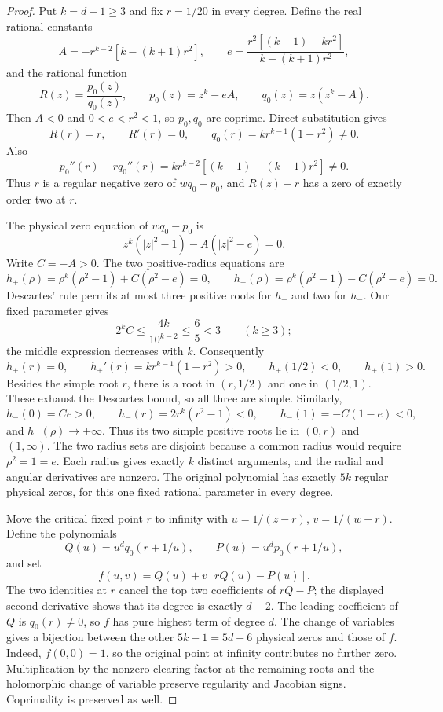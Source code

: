 \documentclass[UTF8,11pt]{ctexart}
\theoremstyle{definition}
\numberwithin{equation}{section}
\begin{document}
\begin{proof}
Put $k=d-1\ge3$ and fix $r=1/20$ in every degree.
Define the real rational constants
\[
 A=-r^{k-2}[k-(k+1)r^2],\qquad
 e=\frac{r^2[(k-1)-kr^2]}{k-(k+1)r^2},
\]
and the rational function
\[
 R(z)=\frac{p_0(z)}{q_0(z)},\qquad
 p_0(z)=z^k-eA,\qquad q_0(z)=z(z^k-A).
\]
Then $A<0$ and $0<e<r^2<1$, so $p_0,q_0$ are
coprime. Direct substitution gives
\[
 R(r)=r,\qquad R'(r)=0,\qquad q_0(r)=kr^{k-1}(1-r^2)\ne0.
\]
Also
\[
 p_0''(r)-rq_0''(r)
       =kr^{k-2}[(k-1)-(k+1)r^2]\ne0.
\]
Thus $r$ is a regular negative zero of $wq_0-p_0$,
and $R(z)-r$ has a zero of exactly order two at $r$.

The physical zero equation of $wq_0-p_0$ is
\[
             z^k(|z|^2-1)-A(|z|^2-e)=0.
\]
Write $C=-A>0$. The two positive-radius equations are
\[
 h_+(\rho)=\rho^k(\rho^2-1)+C(\rho^2-e)=0,
 \qquad
 h_-(\rho)=\rho^k(\rho^2-1)-C(\rho^2-e)=0.
\]
Descartes' rule permits at most three positive roots for
$h_+$ and two for $h_-$. Our fixed parameter gives
\[
 2^k C\le\frac{4k}{10^{k-2}}\le\frac65<3
                                      \qquad(k\ge3);
\]
the middle expression decreases with $k$.
Consequently
\[
 h_+(r)=0,\qquad h_+'(r)=kr^{k-1}(1-r^2)>0,
 \qquad h_+(1/2)<0,\qquad h_+(1)>0.
\]
Besides the simple root $r$, there is a root in $(r,1/2)$
and one in $(1/2,1)$. These exhaust the Descartes bound,
so all three are simple. Similarly,
\[
 h_-(0)=Ce>0,\qquad h_-(r)=2r^k(r^2-1)<0,
 \qquad h_-(1)=-C(1-e)<0,
\]
and $h_-(\rho)\to+\infty$. Thus its two simple positive
roots lie in $(0,r)$ and $(1,\infty)$.
The two radius sets are disjoint because a common radius
would require $\rho^2=1=e$. Each radius gives exactly
$k$ distinct arguments, and the radial and angular
derivatives are nonzero. The original polynomial has
exactly $5k$ regular physical zeros, for this one fixed
rational parameter in every degree.

Move the critical fixed point $r$ to infinity with
$u=1/(z-r)$, $v=1/(w-r)$. Define the polynomials
\[
 Q(u)=u^d q_0(r+1/u),\qquad
 P(u)=u^d p_0(r+1/u),
\]
and set
\[
                       f(u,v)=Q(u)+v[rQ(u)-P(u)].
\]
The two identities at $r$ cancel the top two coefficients
of $rQ-P$; the displayed second derivative shows that
its degree is exactly $d-2$. The leading coefficient
of $Q$ is $q_0(r)\ne0$, so $f$ has pure highest term
of degree $d$. The change of variables gives a bijection
between the other $5k-1=5d-6$ physical zeros and those
of $f$. Indeed, $f(0,0)=1$, so the original point at
infinity contributes no further zero. Multiplication by
the nonzero clearing factor at the remaining roots and
the holomorphic change of variable preserve regularity
and Jacobian signs. Coprimality is preserved as well.


\end{proof}
\end{document}
